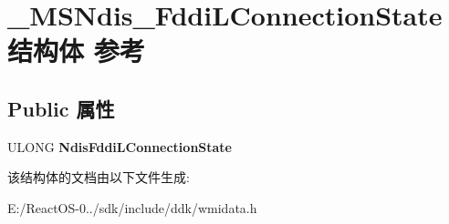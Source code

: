 \hypertarget{struct___m_s_ndis___fddi_l_connection_state}{}\section{\+\_\+\+M\+S\+Ndis\+\_\+\+Fddi\+L\+Connection\+State结构体 参考}
\label{struct___m_s_ndis___fddi_l_connection_state}
\subsection*{Public 属性}
\begin{DoxyCompactItemize}
\item 
\mbox{\label{struct___m_s_ndis___fddi_l_connection_state_ade44d9767dc11c8a7f40c2145d499a39}} 
U\+L\+O\+NG {\bfseries Ndis\+Fddi\+L\+Connection\+State}
\end{DoxyCompactItemize}


该结构体的文档由以下文件生成\+:\begin{DoxyCompactItemize}
\item 
E\+:/\+React\+O\+S-\/0../sdk/include/ddk/wmidata.\+h\end{DoxyCompactItemize}
